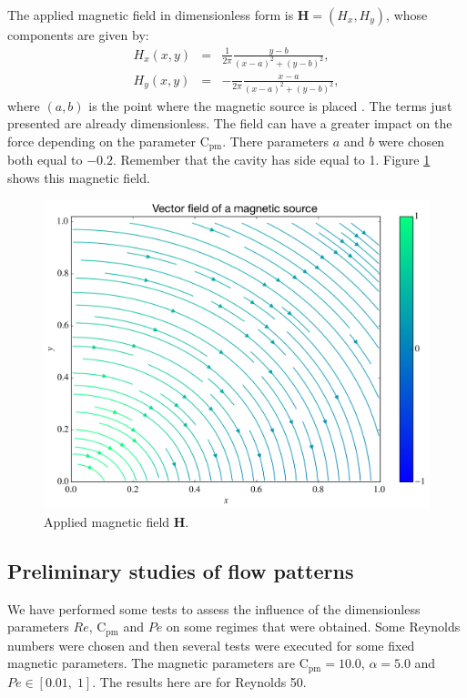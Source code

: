 \documentclass[journal]{IEEEtran}
\begin{document}
The applied magnetic field in dimensionless form is $\mathbf{H}=(H_x,H_y)$, whose components are given by: \begin{eqnarray}
H_x(x,y) & = & \frac{1}{2\pi} \frac{y - b}{(x-a)^2+(y-b)^2},\label{Hx}\\
H_y(x,y) & = & -\frac{}{2\pi} \frac{x - a}{(x-a)^2+(y-b)^2},\label{Hy}
\end{eqnarray} where $(a,b)$ is the point where the magnetic source is placed \cite{Tzirtzilakis2013}. The terms just presented are already dimensionless. The field can have a greater impact on the force depending on the parameter $\mathrm{C}_{\mathrm{pm}}$. There parameters $a$ and $b$ were chosen both equal to $-0.2$. Remember that the cavity has side equal to 1. Figure \ref{magneticField} shows this magnetic field.

\begin{figure}[!t]
\centering
\includegraphics[width=\linewidth]{figures/vectorFieldH}
\caption{Applied magnetic field $\mathbf{H}$.\label{magneticField}}
\end{figure}


\subsection{Preliminary studies of flow patterns}
We have performed some tests to assess the influence of the dimensionless parameters $\mathit{Re}$, $\mathrm{C}_\mathrm{pm}$ and $\mathit{Pe}$ on some regimes that were obtained.  Some Reynolds numbers were chosen and then several tests were executed for some fixed magnetic parameters. The magnetic parameters are $\mathrm{C}_\mathrm{pm}=10.0$, $\alpha = 5.0$ and $\mathit{Pe}\in [0.01,\;1]$. The results here are for Reynolds  50. 
\end{document}
